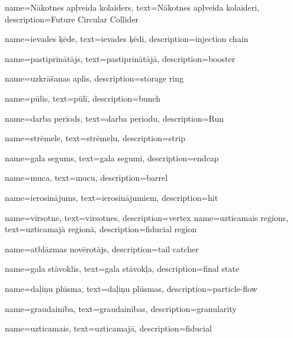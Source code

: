 {
        name=Nākotnes apļveida kolaiders,
        text=Nākotnes apļveida kolaideri,
        description={Future Circular Collider}
}

{
        name=ievades ķēde,
        text=ievades ķēdi,
        description={injection chain}
}

{
        name=pastiprinātājs,
        text=pastiprinātājā,
        description={booster}
}

{
        name=uzkrāšanas aplis,
        description={storage ring}
}

{
        name=pūlis,
        text=pūlī,
        description={bunch}
}

{
        name=darba periods,
        text=darba periodu,
        description={Run}
}

{
        name=strēmele,
        text=strēmeļu,
        description={strip}
}

{
        name=gala segums,
        text=gala segumi,
        description={endcap}
}

{
        name=muca,
        text=mucu,
        description={barrel}
}

{
        name=ierosinājums,
        text=ierosinājumiem,
        description={hit}
}

{
        name=virsotne,
        text=virsotnes,
        description={vertex}
}
{
        name=uzticamais reģions,
        text=uzticamajā reģionā,
        description={fiducial region}
}

{
        name=atblāzmas novērotājs,
        description={tail catcher}
}


{
        name=gala stāvoklis,
        text=gala stāvokļa,
        description={final state}
}

{
        name=daļiņu plūsma,
        text=daļiņu plūsmas,
        description={particle-flow}
}

{
        name=graudainība,
        text=graudainības,
        description={granularity}
}

{
        name=uzticamais,
        text=uzticamajā,
        description={fiducial}
}


